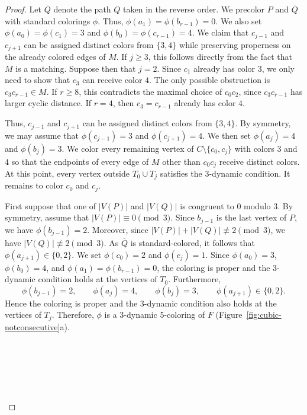 \begin{proof}
Let $\overline{Q}$ denote the path $Q$ taken in the reverse order.
We precolor $P$ and $\overline{Q}$ with standard colorings $\phi$.
Thus, $\phi(a_1)=\phi(b_{r-1})=0$. We also set
$\phi(a_0)=\phi(c_1)=3$ and
$\phi(b_0)=\phi(c_{r-1})=4$.
We claim that $c_{j-1}$ and $c_{j+1}$ can be assigned distinct colors
from $\{3,4\}$ while preserving properness on the already colored edges
of $M$. If $j\geq3$, this follows directly from the fact that $M$ is a
matching. Suppose then that $j=2$. Since $c_1$ already has color $3$, we only
need to show that $c_3$ can receive color $4$. The only possible
obstruction is $c_3c_{r-1}\in M$. If $r\geq8$, this contradicts the
maximal choice of $c_0c_2$, since $c_3c_{r-1}$ has larger cyclic
distance. If $r=4$, then $c_3=c_{r-1}$ already has color $4$.

Thus, $c_{j-1}$ and $c_{j+1}$ can be assigned distinct colors from
$\{3,4\}$. By symmetry, we may assume that
$\phi(c_{j-1})=3$ and $\phi(c_{j+1})=4$. We then set
$\phi(a_j)=4$ and $\phi(b_j)=3$.
We color every remaining vertex of
$C\setminus\{c_0,c_j\}$ with colors $3$ and $4$ so that the endpoints
of every edge of $M$ other than $c_0c_j$ receive distinct colors.
At this point, every vertex outside $T_0\cup T_j$ satisfies the
$3$-dynamic condition. It remains to color $c_0$ and $c_j$.

First suppose that one of $|V(P)|$ and $|V(Q)|$ is congruent to $0$
modulo $3$. By symmetry, assume that $|V(P)|\equiv0\pmod3$.
Since $b_{j-1}$ is the last vertex of $P$, we have
$\phi(b_{j-1})=2$. Moreover, since
$|V(P)|+|V(Q)|\not\equiv2\pmod3$, we have
$|V(Q)|\not\equiv2\pmod3$. As $\overline{Q}$ is standard-colored,
it follows that $\phi(a_{j+1})\in\{0,2\}$.
We set $\phi(c_0)=2$ and $\phi(c_j)=1$. Since
$\phi(a_0)=3$, $\phi(b_0)=4$, and
$\phi(a_1)=\phi(b_{r-1})=0$, the coloring is proper and the
$3$-dynamic condition holds at the vertices of $T_0$.
Furthermore,
\[
\phi(b_{j-1})=2,\qquad
\phi(a_j)=4,\qquad
\phi(b_j)=3,\qquad
\phi(a_{j+1})\in\{0,2\}.
\]
Hence the coloring is proper and the $3$-dynamic condition also holds
at the vertices of $T_j$. Therefore, $\phi$ is a $3$-dynamic
$5$-coloring of $F$ (Figure~\ref{fig:cubic-notconsecutive}a).


\begin{figure}[H]
    \centering

    \begin{subfigure}{0.48\textwidth}
        \centering
        
        \caption{$ $}
        \label{fig:2requiv1mod3}
    \end{subfigure}
    \hfill
    \begin{subfigure}{0.48\textwidth}
        \centering
        
        \caption{$ $}
        \label{fig:cubic-P0mod3}
    \end{subfigure}


\end{figure}
\end{proof}
